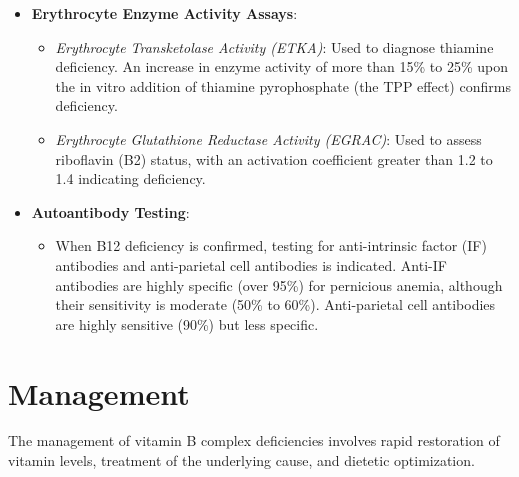 \begin{itemize}
\begin{itemize}
        \item \textit{Total Homocysteine (HCY)}: Elevated in both vitamin B12 and folate deficiencies. Normal levels of both MMA and HCY rule out cobalamin deficiency with high confidence.
    \end{itemize}
    \item \textbf{Erythrocyte Enzyme Activity Assays}:
    \begin{itemize}
        \item \textit{Erythrocyte Transketolase Activity (ETKA)}: Used to diagnose thiamine deficiency. An increase in enzyme activity of more than 15\% to 25\% upon the in vitro addition of thiamine pyrophosphate (the TPP effect) confirms deficiency.
        \item \textit{Erythrocyte Glutathione Reductase Activity (EGRAC)}: Used to assess riboflavin (B2) status, with an activation coefficient greater than 1.2 to 1.4 indicating deficiency.
    \end{itemize}
    \item \textbf{Autoantibody Testing}:
    \begin{itemize}
        \item When B12 deficiency is confirmed, testing for anti-intrinsic factor (IF) antibodies and anti-parietal cell antibodies is indicated. Anti-IF antibodies are highly specific (over 95\%) for pernicious anemia, although their sensitivity is moderate (50\% to 60\%). Anti-parietal cell antibodies are highly sensitive (90\%) but less specific.
    \end{itemize}
\end{itemize}

\section*{Management}
The management of vitamin B complex deficiencies involves rapid restoration of vitamin levels, treatment of the underlying cause, and dietetic optimization.

